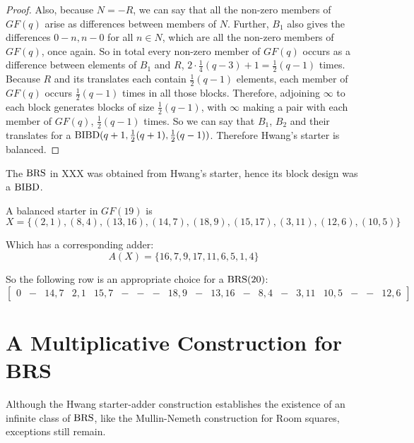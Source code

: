 \begin{proof}
Also, because $N = -R$, we can say that all the non-zero members of $GF(q)$ arise as differences between members of $N$.
Further, $B_1$ also gives the differences $0 - n, n - 0$ for all $n\in N$, which are all the non-zero members of $GF(q)$, once again.
So in total every non-zero member of $GF(q)$ occurs as a difference between elements of $B_1$ and $R$, $2 \cdot \frac{1}{4}(q - 3) + 1 = \frac{1}{2} (q - 1)$ times.
Because $R$ and its translates each contain $\frac{1}{2}(q - 1)$ elements, each member of $GF(q)$ occurs $\frac{1}{2}(q - 1)$ times in all those blocks.
Therefore, adjoining $\infty$ to each block generates blocks of size $\frac{1}{2}(q - 1)$, with $\infty$ making a pair with each member of $GF(q)$, $\frac{1}{2}(q - 1)$ times.
So we can say that $B_1$, $B_2$ and their translates for a $\operatorname{BIBD}(q  +1, \frac{1}{2}(q + 1), \frac{1}{2}(q - 1))$.
Therefore Hwang’s starter is balanced. 
\end{proof}

The $\operatorname{BRS}$ in XXX was obtained from Hwang’s starter, hence its block design was a $\operatorname{BIBD}$.

\begin{example}
A balanced starter in $GF(19)$ is
\begin{equation}
X = \{(2,1),(8,4),(13,16),(14,7),(18,9),(15,17),(3,11),(12,6),(10,5)\}
\end{equation}

Which has a corresponding adder:
\begin{equation}
A(X) = \{16,7,9,17,11,6,5,1,4\}
\end{equation}

So the following row is an appropriate choice for a $\operatorname{BRS}(20)$:
\begin{equation}
 \begin{bmatrix}
   0 & - & 14,7 & 2,1 & 15,7 & - & - & - & 18,9 & - & 13,16 & - & 8,4 & - & 3,11 & 10,5 & - & - & 12,6
 \end{bmatrix}
\end{equation}

\end{example}

\section{A Multiplicative Construction for BRS}

Although the Hwang starter-adder construction establishes the existence of an infinite class of $\operatorname{BRS}$, like the Mullin-Nemeth construction for Room squares, exceptions still remain.


